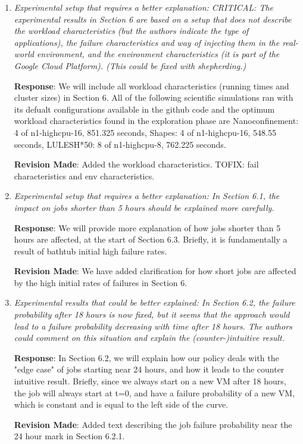 \documentclass{article}
\newcommand{\resp}[1]{\textbf{Response}: #1}
\newcommand{\revmade}[1]{\textbf{Revision Made}: #1}
\begin{document}
\begin{enumerate}
\resp{We will go over all results and present ranges wherever required, and be more precise when summarizing the results, especially when explaining Figure 5, 6. }

\revmade{Made clarification changes in the entire eval section when explaining results.}

\item \emph{Experimental setup that requires a better explanation: CRITICAL: The experimental results in Section 6 are based on a setup that does not describe the workload characteristics (but the authors indicate the type of applications), the failure characteristics and way of injecting them in the real-world environment, and the environment characteristics (it is part of the Google Cloud Platform). (This could be fixed with shepherding.)}

\resp{We will include all workload characteristics (running times and cluster sizes) in Section 6.
All of the following scientific simulations ran with its defualt configurations available in the github code and the optimum workload characteristics found in the exploration phase are Nanoconfinement: 4 of n1-highcpu-16, 851.325 seconds,
Shapes: 4 of n1-highcpu-16, 548.55 seconds,
LULESH*50: 8 of n1-highcpu-8, 762.225 seconds.
}

\revmade{Added the workload characteristics. TOFIX: fail characteristics and env characteristics.}

\item \emph{Experimental setup that requires a better explanation: In Section 6.1, the impact on jobs shorter than 5 hours should be explained more carefully. }

\resp{We will provide more explanation of how jobs shorter than 5 hours are affected, at the start of Section 6.3. Briefly, it is fundamentally a result of bathtub initial high failure rates.} 

\revmade{We have added clarification for how short jobs are affected by the high initial rates of failures in Section 6.}

\item \emph{Experimental results that could be better explained:  In Section 6.2, the failure probability after 18 hours is now fixed, but it seems that the approach would lead to a failure probability decreasing with time after 18 hours. The authors could comment on this situation and explain the (counter-)intuitive result.}

\resp{In Section 6.2, we will explain how our policy deals with the "edge case" of jobs starting near 24 hours, and how it leads to the counter intuitive result. Briefly, since we always start on a new VM after 18 hours, the job will always start at t=0, and have a failure probability of a new VM, which is constant and is equal to the left side of the curve.}

\revmade{Added text describing the job failure probability near the 24 hour mark in Section 6.2.1.}

\end{enumerate}
\end{document}
